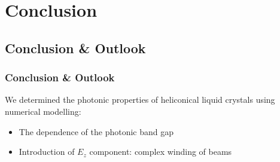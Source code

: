 \documentclass{beamer}
\newenvironment{slide}[1]{\subsection{#1}\begin{frame}\frametitle{#1}}{\end{frame}}
\begin{document}
\section{Conclusion}

\begin{slide}{Conclusion \& Outlook}
We determined the photonic properties of heliconical liquid crystals using numerical modelling: 
\begin{itemize}
  \item The dependence of the photonic band gap 
  \item Introduction of $E_z$ component: complex winding of beams
\end{itemize}
\end{slide}


\end{document}
